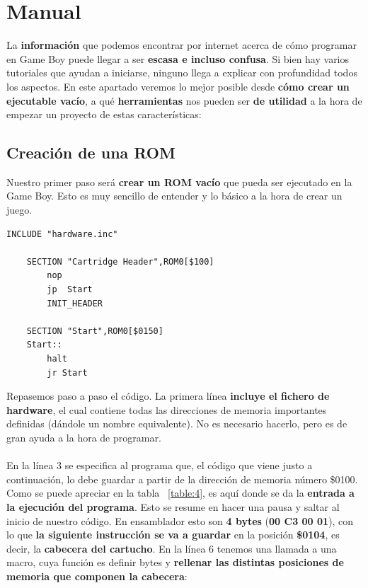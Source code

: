 \chapter{Manual}
\label{ep:manual}

La \textbf{información} que podemos encontrar por internet acerca de cómo programar en Game Boy puede llegar a ser \textbf{escasa e incluso confusa}. Si bien hay varios tutoriales que ayudan a iniciarse, ninguno llega a explicar con profundidad todos los aspectos. En este apartado veremos lo mejor posible desde \textbf{cómo crear un ejecutable vacío}, a qué \textbf{herramientas} nos pueden ser \textbf{de utilidad} a la hora de empezar un proyecto de estas características:

\section{Creación de una ROM}

Nuestro primer paso será \textbf{crear un ROM vacío} que pueda ser ejecutado en la Game Boy. Esto es muy sencillo de entender y lo básico a la hora de crear un juego.

\begin{lstlisting}[caption={Código base de una ROM}, label={code:baseROM}]
    INCLUDE "hardware.inc"
    
    SECTION	"Cartridge Header",ROM0[$100]
        nop
        jp	Start
        INIT_HEADER

	SECTION "Start",ROM0[$0150]
    Start::
        halt
        jr Start
\end{lstlisting}

Repasemos paso a paso el código. La primera línea \textbf{incluye el fichero de hardware}, el cual contiene todas las direcciones de memoria importantes definidas (dándole un nombre equivalente). No es necesario hacerlo, pero es de gran ayuda a la hora de programar.
\\ \\
En la línea 3 se especifica al programa que, el código que viene justo a continuación, lo debe guardar a partir de la dirección de memoria número \$0100. Como se puede apreciar en la tabla ~\ref{table:4}, es aquí donde se da la \textbf{entrada a la ejecución del programa}. Esto se resume en hacer una pausa y saltar al inicio de nuestro código. En ensamblador esto son \textbf{4 bytes} (\textbf{00 C3 00 01}), con lo que \textbf{la siguiente instrucción se va a guardar} en la posición \textbf{\$0104}, es decir, la \textbf{cabecera del cartucho}.
\clearpage
En la línea 6 tenemos una llamada a una macro, cuya función es definir bytes y \textbf{rellenar las distintas posiciones de memoria que componen la cabecera}:

